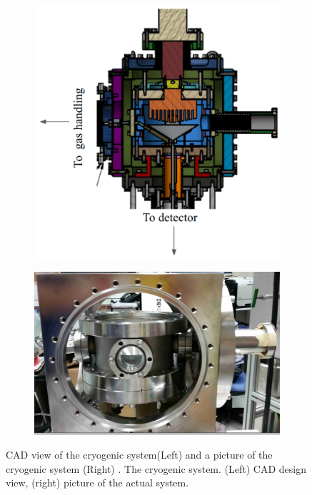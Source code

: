 \begin{figure}[h]
\centering
\begin{subfigure}[c]{0.35\textheight}
\includegraphics[width=\textwidth]{cryoMirror.png}
\end{subfigure}
\begin{subfigure}[c]{0.25\textheight}
\includegraphics[width=\textwidth]{cryoOpenCrop.png}
\end{subfigure}
\caption{ CAD view of the cryogenic system(Left) and a picture of the cryogenic system (Right) . 
The cryogenic system. (Left) CAD design view, 
(right) picture of the actual system.
\label{fig:cryo}}
\end{figure}

